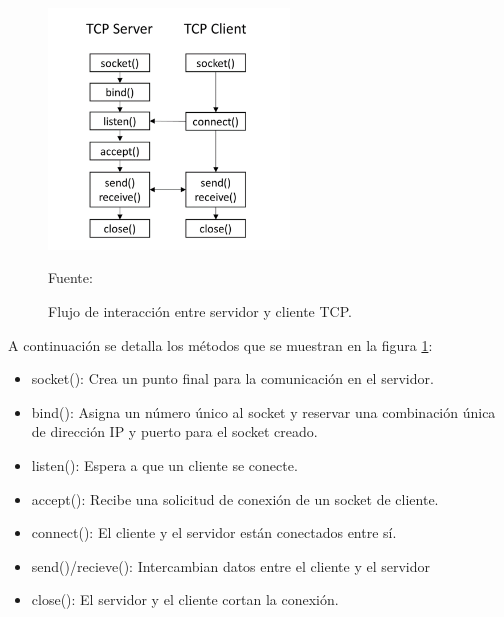 \begin{figure}[H]
    \begin{center}
        \includegraphics[width=6.4cm]{img/capitulo_2/tcp.png}
        \caption{Flujo de interacción entre servidor y cliente TCP.\\}
        Fuente: \cite{tcpsocket}
        \label{fig:tcp_flow}
    \end{center}
\end{figure}

A continuación se detalla los métodos que se muestran en la figura \ref{fig:tcp_flow}:
\begin{itemize}
    \item socket(): Crea un punto final para la comunicación en el servidor.
    \item bind(): Asigna un número único al socket y reservar una combinación única de dirección IP y puerto para el socket creado.
    \item listen(): Espera a que un cliente se conecte.
    \item accept(): Recibe una solicitud de conexión de un socket de cliente.
    \item connect(): El cliente y el servidor están conectados entre sí.
    \item send()/recieve(): Intercambian datos entre el cliente y el servidor
    \item close(): El servidor y el cliente cortan la conexión.
\end{itemize}



